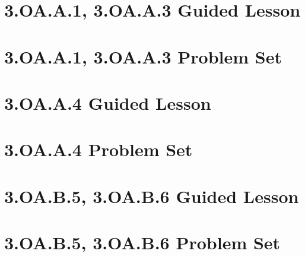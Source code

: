 \documentclass[a4paper,12pt]{article}
\title{}
\date{}
\begin{document}

\hypertarget{toc}{}  %
\tableofcontents

\newpage
{}
\pagestyle{fancy}  %

\newpage
\section{3.OA.A.1, 3.OA.A.3 Guided Lesson}


\newpage
\section{3.OA.A.1, 3.OA.A.3 Problem Set}


\newpage
\section{3.OA.A.4 Guided Lesson}


\newpage
\section{3.OA.A.4 Problem Set}


\newpage
\section{3.OA.B.5, 3.OA.B.6 Guided Lesson}


\newpage
\section{3.OA.B.5, 3.OA.B.6 Problem Set}

\end{document}
